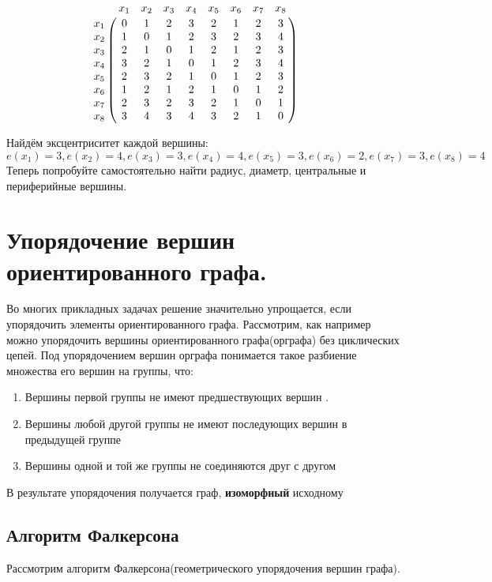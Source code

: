 \documentclass[12pt, a4paper, oneside]{article}
\theoremstyle{plain} %
\theoremstyle{definition}
\begin{document}
\[
 \bordermatrix{ & x_1 & x_2 & x_3 & x_4 & x_5 & x_6 &x_7 & x_8 \cr
  x_1 & 0 & 1 & 2 & 3 & 2 & 1 & 2 & 3 \cr
  x_2 & 1 & 0 & 1 & 2 & 3 & 2 & 3 & 4 \cr
  x_3 & 2 & 1 & 0 & 1 & 2 & 1 & 2 & 3  \cr
  x_4 & 3 & 2 & 1 & 0 & 1 & 2 & 3 & 4 \cr
  x_5 & 2 & 3 & 2 & 1 & 0 & 1 & 2 & 3 \cr
  x_6 & 1 & 2 & 1 & 2 & 1 & 0 & 1 & 2 \cr
  x_7 & 2 & 3 & 2 & 3 & 2 & 1 & 0 & 1 \cr
  x_8 & 3 & 4 & 3 & 4 & 3 & 2 & 1 & 0 } \qquad
\] 

Найдём эксцентриситет каждой вершины:
\[
e(x_1) = 3, 
e(x_2) = 4,
e(x_3) = 3,
e(x_4) = 4,
e(x_5) = 3, 
e(x_6) = 2,
e(x_7) = 3, 
e(x_8) = 4
\]
Теперь попробуйте самостоятельно найти радиус, диаметр, центральные и периферийные вершины. 


\section{Упорядочение вершин ориентированного графа.}

Во многих прикладных задачах решение значительно упрощается, если упорядочить элементы ориентированного графа. Рассмотрим, как например можно упорядочить вершины ориентированного графа(орграфа) без циклических цепей. Под упорядочением вершин орграфа понимается такое разбиение множества его вершин на группы, что:

\begin{enumerate}

\item  Вершины первой группы не имеют предшествующих вершин .

\item Вершины любой другой группы не имеют последующих вершин в предыдущей группе

\item Вершины одной и той же группы не соединяются друг с другом  

\end{enumerate}

В результате упорядочения получается граф, \textbf{изоморфный} исходному 

\subsection*{Алгоритм Фалкерсона}

Рассмотрим алгоритм Фалкерсона(геометрического упорядочения вершин графа).
\end{document}
